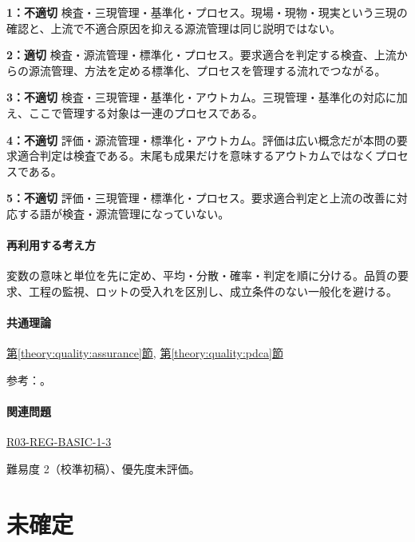\noindent\textbf{1：不適切} 検査・三現管理・基準化・プロセス。現場・現物・現実という三現の確認と、上流で不適合原因を抑える源流管理は同じ説明ではない。\par

\noindent\textbf{2：適切} 検査・源流管理・標準化・プロセス。要求適合を判定する検査、上流からの源流管理、方法を定める標準化、プロセスを管理する流れでつながる。\par

\noindent\textbf{3：不適切} 検査・三現管理・基準化・アウトカム。三現管理・基準化の対応に加え、ここで管理する対象は一連のプロセスである。\par

\noindent\textbf{4：不適切} 評価・源流管理・標準化・アウトカム。評価は広い概念だが本問の要求適合判定は検査である。末尾も成果だけを意味するアウトカムではなくプロセスである。\par

\noindent\textbf{5：不適切} 評価・三現管理・標準化・プロセス。要求適合判定と上流の改善に対応する語が検査・源流管理になっていない。\par

\paragraph{再利用する考え方} 変数の意味と単位を先に定め、平均・分散・確率・判定を順に分ける。品質の要求、工程の監視、ロットの受入れを区別し、成立条件のない一般化を避ける。

\paragraph{共通理論} \hyperref[theory:quality:assurance]{第\ref*{theory:quality:assurance}節}, \hyperref[theory:quality:pdca]{第\ref*{theory:quality:pdca}節}

\par 参考：\cite{quality_process_jsqc,quality_iso_process}。

\paragraph{関連問題} \hyperref[q:r03-reg-basic-1-3]{R03-REG-BASIC-1-3}

\par 難易度 2（校準初稿）、優先度未評価。

\section{未確定}

